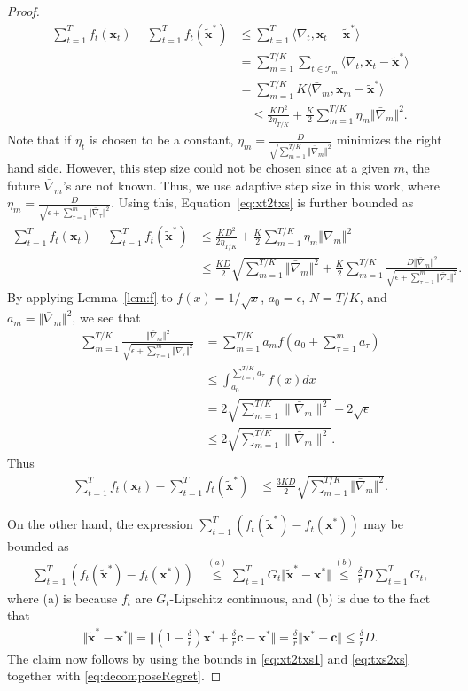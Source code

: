 \documentclass[twoside,11pt,]{article}
\newcommand{\C}[1]{\mathcal{#1}}
\newcommand{\BF}[1]{\mathbf{#1}}
\newcommand{\x}{\BF{x}}
\newcommand{\xs}{\x^*}
\newcommand{\txs}{\tilde{\x}^*}
\newcommand{\normdm}{\Vert \bn_m \Vert}
\newcommand{\sumT}{\sum\limits_{t=1}^T}
\newcommand{\bn}{\bar{\nabla}}
\begin{document}
\begin{proof}
\begin{align}
\sumT f_t (\x_t) - \sumT f_t (\txs) 
&\leq \sumT \langle \nabla_t, \x_t - \txs \rangle \nonumber \\
&= \sum\limits_{m=1}^{T/K} \sum\limits_{t\in\C{T}_m} \langle \nabla_t, \x_t - \txs \rangle \nonumber\\
&= \sum\limits_{m=1}^{T/K} K \langle \bn_m, \x_m - \txs \rangle \nonumber \\
&\quad \leq  \frac{K D^2}{2\eta_{T/K}} + \frac{K}{2} \sum\limits_{m=1}^{T/K} \eta_m \normdm^2.
\end{align}
Note that if $\eta_t$ is chosen to be a constant, $\eta_m = \frac{D}{\sqrt{\sum_{m=1}^{T/K} \Vert \bn_m \Vert^2}}$ minimizes the right hand side. However, this step size could not be chosen since at a given $m$, the future $\bn_m$'s are not known. 
Thus, we use adaptive step size in this work, where $\eta_m = \frac{D}{\sqrt{\epsilon + \sum^m_{\tau=1}\Vert \bn_\tau \Vert^2}}$.
Using this, Equation~\eqref{eq:xt2txs} is further bounded as 
\begin{align*}
\sumT f_t (\x_t) - \sumT f_t (\txs) 
&\leq \frac{K D^2}{2 \eta_{T/K}} + \frac{K}{2} \sum\limits_{m=1}^{T/K} \eta_m \normdm^2 \nonumber \\
& \leq \frac{K D}{2}\sqrt{\sum\limits_{m=1}^{T/K}\Vert \bn_m \Vert^2} 
    + \frac{K}{2} \sum\limits_{m=1}^{T/K} \frac{D \normdm^2}{\sqrt{\epsilon + \sum^m_{\tau=1}\Vert \bn_\tau \Vert^2}}. 
\end{align*}
By applying Lemma~\ref{lem:f} to $f(x) = 1/\sqrt{x}$, $a_0 = \epsilon$, $N = T/K$, and $a_m = \Vert \bn_m \Vert^2$, we see that 
\begin{align*}
\sum_{m=1}^{T/K} \frac{\normdm^2}{\sqrt{\epsilon + \sum^m_{\tau=1}\Vert \bn_\tau \Vert^2}} 
&= \sum_{m=1}^{T/K} a_m f\left( a_0 + \sum^m_{\tau=1} a_\tau \right) \\
&\leq \int_{a_0}^{\sum_{t = \tau}^{T/K} a_\tau} f(x) dx \\
&= 2 \sqrt{\sum_{m=1}^{T/K} \|\bn_m\|^2} - 2 \sqrt{\epsilon} \\
&\leq 2 \sqrt{\sum_{m=1}^{T/K} \|\bn_m\|^2}.
\end{align*}
Thus
\begin{align}
\label{eq:xt2txs1}
\sumT f_t (\x_t) - \sumT f_t (\txs) 
&\leq \frac{3 K D}{2}\sqrt{\sum\limits_{m=1}^{T/K}\Vert \bn_m \Vert^2}.
\end{align}

On the other hand, the expression $\sumT\left(f_t(\txs)-f_t(\xs)\right)$ may be bounded as
\begin{align}
\label{eq:txs2xs}
\sumT\left(f_t(\txs)-f_t(\xs)\right)
&\overset{(a)}{\leq} \sumT G_t \Vert \txs-\xs \Vert 
\overset{(b)}{\leq} \frac{\delta}{r} D \sumT G_t,
\end{align}
where (a) is because $f_t$ are $G_t$-Lipschitz continuous, and (b) is due to the fact that 
\begin{align*}
\Vert \txs-\xs \Vert= \Vert (1-\frac{\delta}{r})\xs+\frac{\delta}{r}\BF{c}-\xs \Vert = \frac{\delta}{r}\Vert  \xs - \BF{c} \Vert \leq \frac{\delta}{r} D.
\end{align*}
The claim now follows by using the bounds in \eqref{eq:xt2txs1} and \eqref{eq:txs2xs} together with \eqref{eq:decomposeRegret}.




\end{proof}
\end{document}
